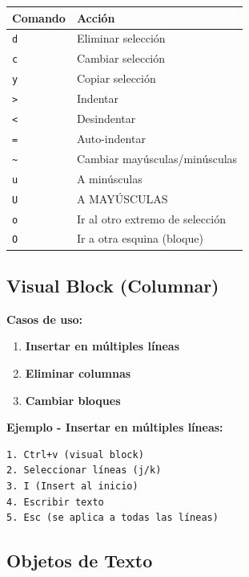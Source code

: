 \documentclass[
  doc,
  floatsintext,
  longtable,
  a4paper,
  nolmodern,
  notxfonts,
  notimes,
  12pt,
  colorlinks=true,linkcolor=blue,citecolor=blue,urlcolor=blue]{apa7}
\providecommand{\tightlist}{%
  \setlength{\itemsep}{0pt}\setlength{\parskip}{0pt}}
\newcounter{none} %
\begin{document}
{\def\LTcaptype{none} %
\begin{longtable}[]{@{}ll@{}}
\toprule\noalign{}
Comando & Acción \\
\midrule\noalign{}
\endhead
\bottomrule\noalign{}
\endlastfoot
\texttt{d} & Eliminar selección \\
\texttt{c} & Cambiar selección \\
\texttt{y} & Copiar selección \\
\texttt{\textgreater{}} & Indentar \\
\texttt{\textless{}} & Desindentar \\
\texttt{=} & Auto-indentar \\
\texttt{\textasciitilde{}} & Cambiar mayúsculas/minúsculas \\
\texttt{u} & A minúsculas \\
\texttt{U} & A MAYÚSCULAS \\
\texttt{o} & Ir al otro extremo de selección \\
\texttt{O} & Ir a otra esquina (bloque) \\
\end{longtable}
}

\subsection{Visual Block (Columnar)}\label{visual-block-columnar}

\textbf{Casos de uso:}

\begin{enumerate}
\def\labelenumi{\arabic{enumi}.}
\tightlist
\item
  \textbf{Insertar en múltiples líneas}
\item
  \textbf{Eliminar columnas}
\item
  \textbf{Cambiar bloques}
\end{enumerate}

\textbf{Ejemplo - Insertar en múltiples líneas:}

\begin{verbatim}
1. Ctrl+v (visual block)
2. Seleccionar líneas (j/k)
3. I (Insert al inicio)
4. Escribir texto
5. Esc (se aplica a todas las líneas)
\end{verbatim}

\subsection{Objetos de Texto}\label{objetos-de-texto}
\end{document}
